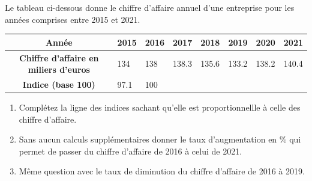 \documentclass[main.tex]{subfiles}
\begin{document}
\begin{exercise}\hfill 
	
	Le tableau ci-dessous donne le chiffre d'affaire annuel d'une entreprise pour les années comprises entre 2015 et 2021. 
	
	\noindent \begin{tabularx}{0.95\linewidth}{|c|X|X|X|X|X|X|X|}\hline 
		\textbf{Année} &2015 &2016 &2017 &2018 & 2019 & 2020 &2021 \\ \hline 
		\textbf{Chiffre d'affaire en miliers d'euros} & 134 & 138 & 138.3 & 135.6 & 133.2 & 138.2 &140.4 \\ \hline 
		\textbf{Indice (base 100)} & 97.1 & 100 & & &&&
		\\ \hline 
	\end{tabularx}
	\begin{enumerate}[label=\arabic*), leftmargin=*]
		\item Complétez la ligne des indices sachant qu'elle est proportionnellle à celle des chiffre d'affaire.
		\item Sans aucun calculs supplémentaires donner le taux d'augmentation en \% qui permet de passer du chiffre d'affaire de 2016 à celui de 2021.
		\item Même question avec le taux de diminution du chiffre d'affaire de 2016 à 2019.
	\end{enumerate}
\end{exercise}
\end{document}
